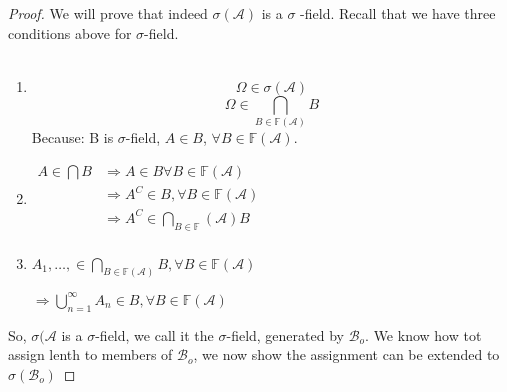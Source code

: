 \documentclass[11pt,fleqn]{book} %
\begin{document}
\begin{proof} We will prove that indeed $\sigma(\mathcal{A})$ is a $\sigma$ -field. Recall that we have three conditions above for $\sigma$-field.\\
\\
	\begin{enumerate}[label = (\roman*)]
		\item $$\Omega \in \sigma(\mathcal{A})$$ 
			$$\Omega \in \bigcap_{B \in \mathbb{F}(\mathcal{A})} B $$
			Because: B is $\sigma$-field, $A \in B$, $\forall B \in \mathbb{F}(\mathcal{A})$.
		\item 
			$\begin{aligned}
							A \in \bigcap  B &\Rightarrow A \in B \forall B \in\mathbb{F}(\mathcal{A})\\
							&\Rightarrow A^C \in B , \forall B  \in \mathbb{F}(\mathcal{A})\\ 
							&\Rightarrow A^C \in \bigcap_{B \in \mathbb{F}}(\mathcal{A}) B\\
						\end{aligned}$

		\item $A_1, \dots, \in \bigcap_{B \in \mathbb{F}(\mathcal{A})} B, \forall  B  \in \mathbb{F}(\mathcal{A})$

		$\Rightarrow \bigcup^\infty_{n =1} A_n \in B, \forall B \in \mathbb{F}(\mathcal{A})$

	\end{enumerate}

	So, $\sigma(\mathcal{A}$ is a $\sigma$-field, we call it the $\sigma$-field, generated by $\mathcal{B}_o$. We know how tot assign lenth to members of $\mathcal{B}_o$, we now show the assignment can be extended to $\sigma(\mathcal{B}_o)$ 


\end{proof}
\end{document}

